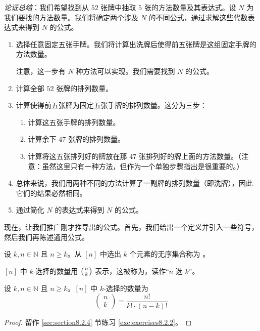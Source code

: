 \emph{论证总结}：我们希望找到从 $52$ 张牌中抽取 $5$ 张的方法数量及其表达式。设 $N$ 为我们要找的方法数量。我们将确定两个涉及 $N$ 的不同公式，通过求解这些代数表达式来得到 $N$ 的公式。

\begin{enumerate}[label=(\arabic*)]
    \item 选择任意固定五张手牌。我们将计算出洗牌后使得前五张牌是这组固定手牌的方法数量。

          注意，这一步有 $N$ 种方法可以实现。我们需要找到 $N$ 的公式。
    \item 计算全部 $52$ 张牌的排列数量。
    \item 计算使得前五张牌为固定五张手牌的排列数量。这分为三步：
          \begin{enumerate}[label=(\roman*)]
              \item 计算这五张手牌的排列数量。
              \item 计算余下 $47$ 张牌的排列数量。
              \item 计算将这五张排列好的牌放在那 $47$ 张排列好的牌上面的方法数量。（注意：虽然这里只有一种方法，但作为一个单独步骤指出是很重要的。）
          \end{enumerate}
    \item 总体来说，我们用两种不同的方法计算了一副牌的排列数量（即洗牌），因此它们的结果必然相同。
    \item 通过简化 $N$ 的表达式来得到 $N$ 的公式。
\end{enumerate}
现在，让我们推广刚才推导出的公式。首先，我们给出一个定义并引入一些符号，然后我们再陈述通用公式。

\begin{definition}
    设 $k, n \in \mathbb{N}$ 且 $n \ge k$。从 $[n]$ 中选出 $k$ 个元素的无序集合称为 。

    $[n]$ 中 $k$-选择的数量用 $\big({n \atop k}\big)$ 表示，这被称为，读作``$n$ 选 $k$''。
\end{definition}

\begin{proposition}\label{prop:proposition8.2.16}
    设 $k, n \in \mathbb{N}$ 且 $n \ge k$。$[n]$ 中 $k$-选择的数量为
    \[\begin{pmatrix}
            n \\
            k
        \end{pmatrix} = \frac{n!}{k! \cdot (n-k)!}\]
\end{proposition}

\begin{proof}
    留作 \ref{sec:section8.2.4} 节练习 \ref{exc:exercises8.2.2}。
\end{proof}

